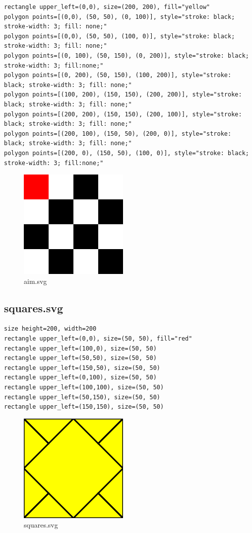 \documentclass{article}
\theoremstyle{definition}
\theoremstyle{remark}
\begin{document}
\begin{verbatim}
rectangle upper_left=(0,0), size=(200, 200), fill="yellow"
polygon points=[(0,0), (50, 50), (0, 100)], style="stroke: black; stroke-width: 3; fill: none;"
polygon points=[(0,0), (50, 50), (100, 0)], style="stroke: black; stroke-width: 3; fill: none;"
polygon points=[(0, 100), (50, 150), (0, 200)], style="stroke: black; stroke-width: 3; fill:none;"
polygon points=[(0, 200), (50, 150), (100, 200)], style="stroke: black; stroke-width: 3; fill: none;"
polygon points=[(100, 200), (150, 150), (200, 200)], style="stroke: black; stroke-width: 3; fill: none;"
polygon points=[(200, 200), (150, 150), (200, 100)], style="stroke: black; stroke-width: 3; fill: none;"
polygon points=[(200, 100), (150, 50), (200, 0)], style="stroke: black; stroke-width: 3; fill: none;"
polygon points=[(200, 0), (150, 50), (100, 0)], style="stroke: black; stroke-width: 3; fill:none;"
\end{verbatim}

\begin{figure}[H]
  \centering
  \includegraphics[scale=0.6]{images/grid}
  \caption{aim.svg}
\end{figure}

\subsection{squares.svg}

\begin{verbatim}
size height=200, width=200
rectangle upper_left=(0,0), size=(50, 50), fill="red"
rectangle upper_left=(100,0), size=(50, 50)
rectangle upper_left=(50,50), size=(50, 50)
rectangle upper_left=(150,50), size=(50, 50)
rectangle upper_left=(0,100), size=(50, 50)
rectangle upper_left=(100,100), size=(50, 50)
rectangle upper_left=(50,150), size=(50, 50)
rectangle upper_left=(150,150), size=(50, 50)
\end{verbatim}

\begin{figure}[H]
  \centering
  \includegraphics[scale=0.6]{images/squares}
  \caption{squares.svg}
\end{figure}
\end{document}
